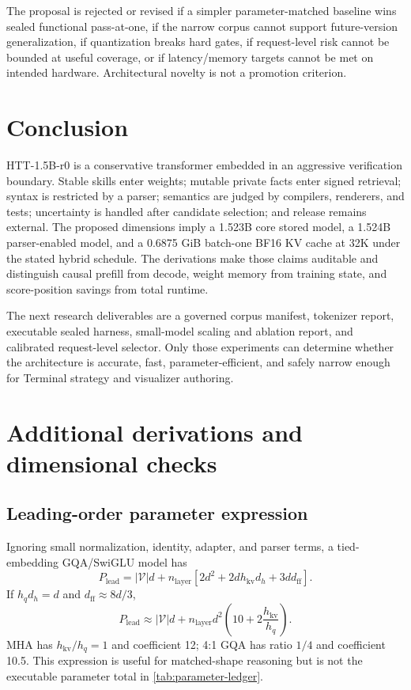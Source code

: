 \documentclass[10pt,letterpaper]{article}
\newcommand{\1}{\mathbb{1}}
\begin{document}
The proposal is rejected or revised if a simpler parameter-matched baseline wins sealed functional
pass-at-one, if the narrow corpus cannot support future-version generalization, if quantization breaks
hard gates, if request-level risk cannot be bounded at useful coverage, or if latency/memory targets
cannot be met on intended hardware.  Architectural novelty is not a promotion criterion.

\section{Conclusion}

HTT-1.5B-r0 is a conservative transformer embedded in an aggressive verification boundary.  Stable
skills enter weights; mutable private facts enter signed retrieval; syntax is restricted by a parser;
semantics are judged by compilers, renderers, and tests; uncertainty is handled after candidate
selection; and release remains external.  The proposed dimensions imply a 1.523B core stored model,
a 1.524B parser-enabled model, and a 0.6875 GiB batch-one BF16 KV cache at 32K under the stated hybrid
schedule.  The derivations make those claims auditable and distinguish causal prefill from decode,
weight memory from training state, and score-position savings from total runtime.

The next research deliverables are a governed corpus manifest, tokenizer report, executable sealed
harness, small-model scaling and ablation report, and calibrated request-level selector.  Only those
experiments can determine whether the architecture is accurate, fast, parameter-efficient, and safely
narrow enough for Terminal strategy and visualizer authoring.

\appendix

\section{Additional derivations and dimensional checks}

\subsection{Leading-order parameter expression}

Ignoring small normalization, identity, adapter, and parser terms, a tied-embedding GQA/SwiGLU model
has
\begin{equation}
  P_{\mathrm{lead}}
  =|\mathcal V|d+n_{\mathrm{layer}}
    \left[2d^2+2dh_{\mathrm{kv}}d_h+3dd_{\mathrm{ff}}\right].
  \label{eq:leading-param}
\end{equation}
If $h_qd_h=d$ and $d_{\mathrm{ff}}\approx8d/3$,
\begin{equation}
  P_{\mathrm{lead}}
  \approx|\mathcal V|d+n_{\mathrm{layer}}d^2
  \left(10+2\frac{h_{\mathrm{kv}}}{h_q}\right).
  \label{eq:leading-param-ratio}
\end{equation}
MHA has $h_{\mathrm{kv}}/h_q=1$ and coefficient 12; 4:1 GQA has ratio $1/4$ and
coefficient 10.5.  This expression is useful for matched-shape reasoning but is not the executable
parameter total in \cref{tab:parameter-ledger}.
\end{document}
